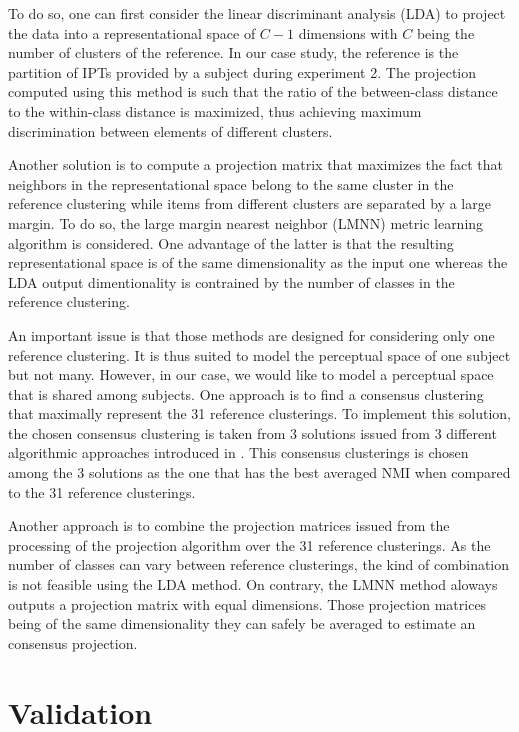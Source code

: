 \documentclass{article}
\newcommand{\ipts}{IPTs\xspace}
\begin{document}
To do so, one can first consider the linear discriminant analysis (LDA) \cite{duda2000pattern} to project the data into a representational space of $C-1$ dimensions with $C$ being the number of clusters of the reference. In our case study, the reference is the partition of \ipts provided by a subject during experiment 2. The projection computed using this method is such that the ratio of the between-class distance to the within-class distance is maximized, thus achieving maximum discrimination between elements of different clusters.

Another solution is to compute a projection matrix that maximizes the fact that neighbors in the representational space belong to the same cluster in the reference clustering while items from different clusters are separated by a large margin. To do so, the large margin nearest neighbor (LMNN) metric learning algorithm \cite{weinberger2006distance, weinberger2009distance} is considered. One advantage of the latter is that the resulting representational space is of the same dimensionality as the input one whereas the LDA output dimentionality is contrained by the number of classes in the reference clustering.

An important issue is that those methods are designed for considering only one reference clustering. It is thus suited to model the perceptual space of one subject but not many. However, in our case, we would like to model a perceptual space that is shared among subjects. One approach is to find a consensus clustering that maximally represent the 31 reference clusterings. To implement this solution, the chosen consensus clustering is taken from 3 solutions issued from 3 different algorithmic approaches introduced in \cite{strehl2002cluster}. This consensus clusterings is chosen among the 3 solutions as the one that has the best averaged NMI when compared to the 31 reference clusterings.

Another approach is to combine the projection matrices issued from the processing of the projection algorithm over the 31 reference clusterings. As the number of classes can vary between reference clusterings, the kind of combination is not feasible using the LDA method. On contrary, the LMNN method aloways outputs a projection matrix with equal dimensions. Those projection matrices being of the same dimensionality they can safely be averaged to estimate an consensus projection.

\section{Validation}\label{sec:validation}
\end{document}
